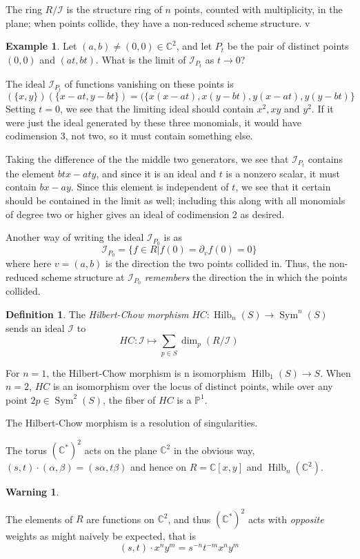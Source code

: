 \documentclass{amsart}[12pt]
\theoremstyle{definition}
\newtheorem{example}[dummy]{Example}
\newtheorem{definition}[dummy]{Definition}
\newtheorem{warning}[dummy]{Warning}
\newcommand{\C}{\mathbb{C}}
\newcommand{\proj}{\mathbb{P}}
\DeclareMathOperator{\Hilb}{Hilb}
\DeclareMathOperator{\Sym}{Sym}
\begin{document}
The ring $R/\mathcal{I}$ is the structure ring of $n$ points, counted with multiplicity, in the plane; when points collide, they have a non-reduced scheme structure.  
v
\begin{example}
Let $(a,b)\neq (0,0)\in\C^2$, and let $P_t$ be the pair of distinct points $(0,0)$ and $(at,bt)$.  What is the limit of $\mathcal{I}_{P_t}$ as $t\to 0$?


The ideal $\mathcal{I}_{P_t}$ of functions vanishing on these points is 
$$(\{x,y\})(\{x-at,y-bt\})=(\{x(x-at),x(y-bt), y(x-at), y(y-bt)\}$$
Setting $t=0$, we see that the limiting ideal should contain $x^2, xy$ and $y^2$.  If it were just the ideal generated by these three monomials, it would have codimension 3, not two, so it must contain something else.

Taking the difference of the the middle two generators, we see that $\mathcal{I}_{P_t}$ contains the element $btx-aty$, and since it is an ideal and $t$ is a nonzero scalar, it must contain $bx-ay$.  Since this element is independent of $t$, we see that it certain should be contained in the limit as well; including this along with all monomials of degree two or higher gives an ideal of codimension 2 as desired.

Another way of writing the ideal $\mathcal{I}_{P_0}$ is as 
$$\mathcal{I}_{P_0}=\{f\in R| f(0)=\partial_vf(0)=0\}$$
where here $v=(a,b)$ is the direction the two points collided in.  Thus, the non-reduced scheme structure at $\mathcal{I}_{P_0}$ \emph{remembers} the direction the in which the points collided. 
\end{example}

\begin{definition}
The \emph{Hilbert-Chow morphism} $HC:\Hilb_n(S)\to\Sym^n(S)$ sends an ideal $\mathcal{I}$ to 
$$HC:\mathcal{I}\mapsto \sum_{p\in S} \dim_p (R/\mathcal{I})$$
\end{definition}


For $n=1$, the Hilbert-Chow morphism is n isomorphism $\Hilb_1(S)\to S$.  When $n=2$, $HC$ is an isomorphism over the locus of distinct points, while over any point $2p\in\Sym^2(S)$, the fiber of $HC$ is a $\proj^1$.

The Hilbert-Chow morphism is a resolution of singularities.


The torus $(\C^*)^2$ acts on the plane $\C^2$ in the obvious way, $(s,t)\cdot (\alpha,\beta)=(s\alpha,t\beta)$ and hence on $R=\C[x,y]$ and $\Hilb_n(\C^2)$.  

\begin{warning} \label{warning:action-sign}

 The elements of $R$ are functions on $\C^2$, and thus $(\C^*)^2$ acts with \emph{opposite} weights as might naively be expected, that is 
$$(s,t)\cdot x^ny^m=s^{-n}t^{-m}x^ny^m$$

\end{warning}
\end{document}
